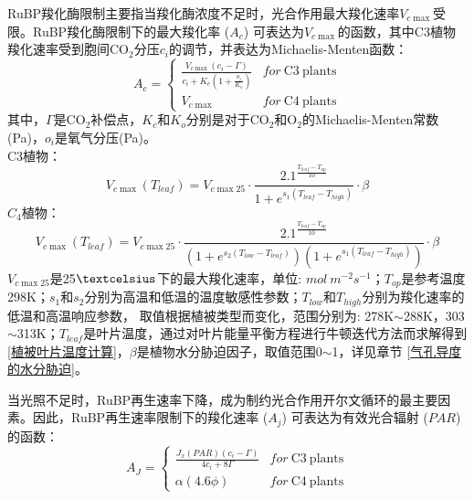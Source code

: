 RuBP羧化酶限制主要指当羧化酶浓度不足时，光合作用最大羧化速率$V_{c \max }$受限。RuBP羧化酶限制下的最大羧化率 ($A_c$) 可表达为$V_{c \max }$的函数，其中C3植物羧化速率受到胞间CO$_2$分压$c_i$的调节，并表达为Michaelis-Menten函数：
\begin{equation}\label{A_C1}
A_{c}=\left\{\begin{array}{ll}\frac{V_{c \max }\left(c_{i}-\Gamma\right)}{c_{i}+K_{c}\left(1+\frac{o_{i}}{K_{o}}\right)}
     & { for\ } \mathrm{ C3\ } \mathrm{ plants } \\ V_{c \max } & { for\ } \mathrm{ C4\ } \mathrm{ plants }\end{array}\right.
\end{equation}
其中，$\Gamma$是CO$_2$补偿点，$K_c$和$K_o$分别是对于CO$_2$和O$_2$的Michaelis-Menten常数(Pa)，$o_i$是氧气分压(Pa)。\\
C3植物：\\
\begin{equation}\label{V_cmax_a}
V_{c \max }\left(T_{{leaf }}\right)=V_{c \max 25} \cdot \frac{2.1^{\frac{T_{{leaf }}-T_{o p}}{10}}}{1+e^{s_{1}\left(T_{{leaf }}-T_{{high }}\right)}} \cdot \beta
\end{equation}
$C_4$植物：\\
\begin{equation}\label{V_cmax_b}
V_{c \max }\left(T_{{leaf }}\right)=V_{c \max 25} \cdot \frac{2.1^{\frac{T_{{leaf }}-T_{o p}}{10}}}{\left(1+e^{s_{2}\left(T_{{low }}
 - T_{{leaf }}\right)}\right)\left(1+e^{s_{1}\left(T_{{leaf }}-T_{h i g h}\right)}\right)} \cdot \beta
\end{equation}
$V_{c \max 25}$是25$\textcelsius$下的最大羧化速率，单位: $mol \mathrm{ }\ m^{-2}s^{-1}$；$T_{op}$是参考温度298K；$s_1$和$s_2$分别为高温和低温的温度敏感性参数；$T_{low}$和$T_{high}$分别为羧化速率的低温和高温响应参数，
取值根据植被类型而变化，范围分别为: 278K$\sim$288K，303$\sim$313K；$T_{leaf}$是叶片温度，通过对叶片能量平衡方程进行牛顿迭代方法而求解得到 \ref{植被叶片温度计算}，$\beta$是植物水分胁迫因子，取值范围0$\sim$1，详见章节 \ref{气孔导度的水分胁迫}。

当光照不足时，RuBP再生速率下降，成为制约光合作用开尔文循环的最主要因素。因此，RuBP再生速率限制下的羧化速率 ($A_j$) 可表达为有效光合辐射 ($PAR$) 的函数：
\begin{equation}\label{A_J1}
A_{J}=\left\{\begin{array}{ll}\frac{J_x\left(PAR\right)\left(c_{i}-\Gamma\right)}{4c_{i}+8\Gamma}
     & { for\ } \mathrm{ C3\ } \mathrm{ plants } \\ \alpha\left(4.6\phi\right) & { for\ } \mathrm{ C4\ } \mathrm{ plants }\end{array}\right.
\end{equation}

